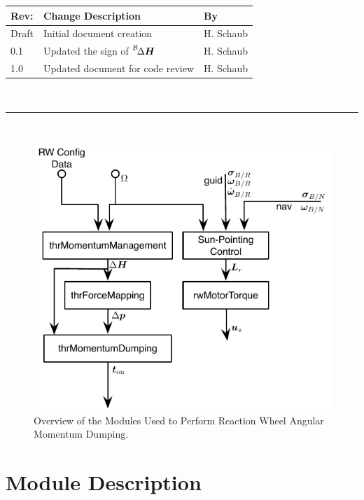 \documentclass[]{BasiliskReportMemo}
\begin{document}
\makeCover


%
%
\pagestyle{empty}
{\renewcommand{\arraystretch}{1.1}
\noindent
\begin{longtable}{|p{0.5in}|p{4.5in}|p{1.14in}|}
\hline
{\bfseries Rev}: & {\bfseries Change Description} & {\bfseries By} \\
\hline
Draft & Initial document creation & H. Schaub \\
0.1 & Updated the sign of $\leftexp{B}{\Delta\bm H}$ & H. Schaub \\
1.0 & Updated document for code review & H. Schaub \\
\hline

\end{longtable}
}

\newpage
\setcounter{page}{1}
\pagestyle{fancy}

\tableofcontents
~\\ \hrule ~\\

\begin{figure}[htb]
	\centerline{
	\includegraphics[]{Figures/rwMomentumOverview}
	}
	\caption{Overview of the Modules Used to Perform Reaction Wheel Angular Momentum Dumping.}
	\label{fig:Fig1}
\end{figure}

\section{Module Description}
\end{document}
